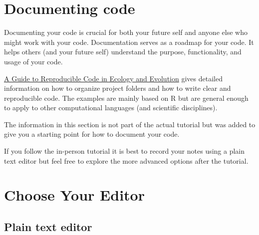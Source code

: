 \documentclass[
  letterpaper,
  DIV=11,
  numbers=noendperiod]{scrreprt}
\author{}
\date{}
\renewcommand*\contentsname{Table of contents}
\newcommand\contentsname{Table of contents}
\begin{document}

\renewcommand*\contentsname{Table of contents}
{
\hypersetup{linkcolor=}
\setcounter{tocdepth}{1}
\tableofcontents
}
\section{Documenting code}\label{documenting-code}

Documenting your code is crucial for both your future self and anyone
else who might work with your code. Documentation serves as a roadmap
for your code. It helps others (and your future self) understand the
purpose, functionality, and usage of your code.

\href{https://www.britishecologicalsociety.org/wp-content/uploads/2017/12/guide-to-reproducible-code.pdf}{A
Guide to Reproducible Code in Ecology and Evolution} gives detailed
information on how to organize project folders and how to write clear
and reproducible code. The examples are mainly based on R but are
general enough to apply to other computational languages (and scientific
disciplines).

\begin{tcolorbox}[enhanced jigsaw, opacityback=0, toprule=.15mm, colbacktitle=quarto-callout-note-color!10!white, colframe=quarto-callout-note-color-frame, titlerule=0mm, bottomrule=.15mm, breakable, coltitle=black, leftrule=.75mm, colback=white, bottomtitle=1mm, opacitybacktitle=0.6, toptitle=1mm, title=\textcolor{quarto-callout-note-color}{\faInfo}\hspace{0.5em}{Note}, arc=.35mm, rightrule=.15mm, left=2mm]

The information in this section is not part of the actual tutorial but
was added to give you a starting point for how to document your code.

If you follow the in-person tutorial it is best to record your notes
using a plain text editor but feel free to explore the more advanced
options after the tutorial.

\end{tcolorbox}

\section{Choose Your Editor}\label{choose-your-editor}

\subsection{Plain text editor}\label{plain-text-editor}
\end{document}
